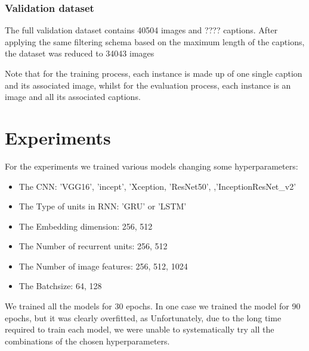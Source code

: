 \subsubsection{Validation dataset}

The full validation dataset contains 40504 images and  ???? captions. 
After applying the same filtering schema based on the maximum length of the captions, the dataset was reduced to 34043 images

Note that for the training process, each instance is made up of one single caption and its associated image, whilst for the evaluation process, each instance is an image and all its associated captions. 

\section{Experiments}

For the experiments we trained various models changing some hyperparameters:
\begin{itemize}
    \item The CNN: 'VGG16', 'incept', 'Xception, 'ResNet50', ,'InceptionResNet\_v2'
    \item The Type of units in RNN: 'GRU' or 'LSTM'
    \item The Embedding dimension: 256, 512
    \item The Number of recurrent units: 256, 512
    \item The Number of image features: 256, 512, 1024
    \item The Batchsize: 64, 128
\end{itemize}

We trained all the models for 30 epochs. In one case we trained the model for 90 epochs, but it was clearly overfitted, as 
Unfortunately, due to the long time required to train each model, we were unable to systematically try all the combinations of the chosen hyperparameters. 



